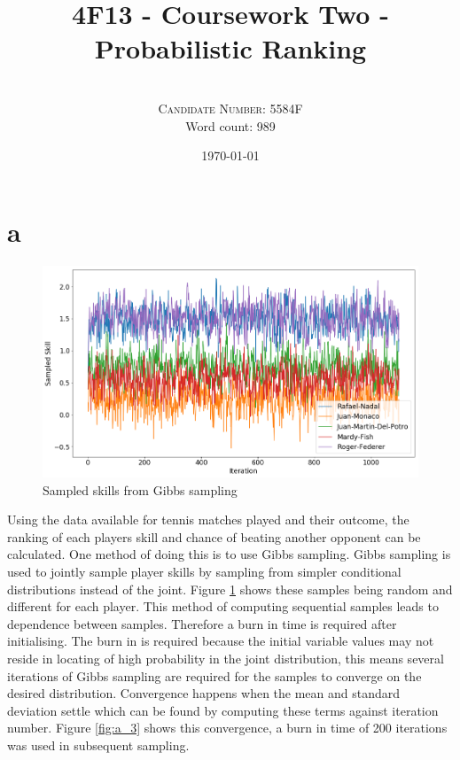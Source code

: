 \documentclass[twoside,twocolumn]{article}
\title{4F13 - Coursework Two - Probabilistic Ranking } %
\author{%
\\
\textsc{Candidate Number: 5584F} \\
\normalsize Word count: 989 \\
}
\date{\today} %
\begin{document}
\onecolumn

\twocolumn
\maketitle



\section{a}
\begin{figure}[h]
  \centering
    \includegraphics[width=\linewidth]{a_1}
  \caption{Sampled skills from Gibbs sampling}
  \label{fig:a_1}
\end{figure}
Using the data available for tennis matches played and their outcome, the ranking of each players skill and chance of beating another opponent can be calculated. One method of doing this is to use Gibbs sampling. Gibbs sampling is used to jointly sample player skills by sampling from simpler conditional distributions instead of the joint. Figure \ref{fig:a_1} shows these samples being random and different for each player. This method of computing sequential samples leads to dependence between samples. Therefore a burn in time is required after initialising. The burn in is required because the initial variable values may not reside in locating of high probability in the joint distribution, this means several iterations of Gibbs sampling are required for the samples to converge on the desired distribution. Convergence happens when the mean and standard deviation settle which can be found by computing these terms against iteration number. Figure \ref{fig:a_3} shows this convergence, a burn in time of 200 iterations was used in subsequent sampling.
\end{document}
